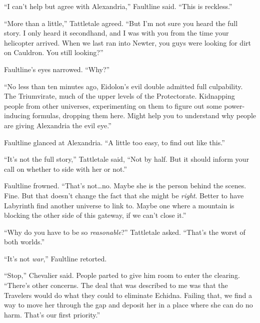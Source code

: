 ``I can't help but agree with Alexandria,'' Faultline said.  ``This is reckless.''



``More than a little,'' Tattletale agreed.  ``But I'm not sure you heard the full story.  I only heard it secondhand, and I was with you from the time your helicopter arrived.  When we last ran into Newter, you guys were looking for dirt on Cauldron.  You still looking?''



Faultline's eyes narrowed.  ``Why?''



``No less than ten minutes ago, Eidolon's evil double admitted full culpability.  The Triumvirate, much of the upper levels of the Protectorate.  Kidnapping people from other universes, experimenting on them to figure out some power-inducing formulas, dropping them here.  Might help you to understand why people are giving Alexandria the evil eye.''



Faultline glanced at Alexandria.  ``A little too easy, to find out like this.''



``It's not the full story,'' Tattletale said, ``Not by half.  But it should inform your call on whether to side with her or not.''



Faultline frowned.  ``That's not\ldots no.  Maybe she is the person behind the scenes.  Fine.  But that doesn't change the fact that she might be \emph{right}.  Better to have Labyrinth find another universe to link to.  Maybe one where a mountain is blocking the other side of this gateway, if we can't close it.''



``Why do you have to be so \emph{reasonable}?'' Tattletale asked.  ``That's the worst of both worlds.''



``It's not \emph{war},'' Faultline retorted.



``Stop,'' Chevalier said.  People parted to give him room to enter the clearing.  ``There's other concerns.  The deal that was described to me was that the Travelers would do what they could to eliminate Echidna.  Failing that, we find a way to move her through the gap and deposit her in a place where she can do no harm.  That's our first priority.''



